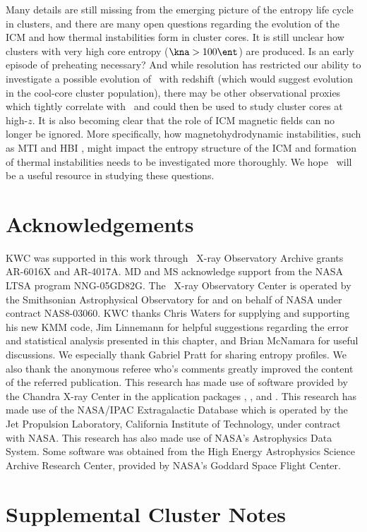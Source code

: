 Many details are still missing from the emerging picture of the
entropy life cycle in clusters, and there are many open questions
regarding the evolution of the ICM and how thermal instabilities form
in cluster cores. It is still unclear how clusters with very high core
entropy ($\kna > 100 \ent$) are produced. Is an early episode of
preheating necessary? And while resolution has restricted our ability
to investigate a possible evolution of \kna\ with redshift (which
would suggest evolution in the cool-core cluster population), there
may be other observational proxies which tightly correlate with
\kna\ and could then be used to study cluster cores at high-$z$. It is
also becoming clear that the role of ICM magnetic fields can no longer
be ignored. More specifically, how magnetohydrodynamic instabilities,
such as MTI \citep{2000ApJ...534..420B, 2008ApJ...673..758Q} and HBI
\citep{2008ApJ...677L...9P}, might impact the entropy structure of the
ICM and formation of thermal instabilities needs to be investigated
more thoroughly. We hope \accept\ will be a useful resource in
studying these questions.

\section{Acknowledgements}

KWC was supported in this work through \chandra\ X-ray Observatory
Archive grants AR-6016X and AR-4017A. MD and MS acknowledge support
from the NASA LTSA program NNG-05GD82G. The \chandra\ X-ray
Observatory Center is operated by the Smithsonian Astrophysical
Observatory for and on behalf of NASA under contract NAS8-03060. KWC
thanks Chris Waters for supplying and supporting his new KMM code, Jim
Linnemann for helpful suggestions regarding the error and statistical
analysis presented in this chapter, and Brian McNamara for useful
discussions. We especially thank Gabriel Pratt for sharing entropy
profiles. We also thank the anonymous referee who's comments greatly
improved the content of the referred publication. This research has
made use of software provided by the Chandra X-ray Center in the
application packages \ciao, \chips, and \sherpa. This research has
made use of the NASA/IPAC Extragalactic Database which is operated by
the Jet Propulsion Laboratory, California Institute of Technology,
under contract with NASA. This research has also made use of NASA's
Astrophysics Data System. Some software was obtained from the High
Energy Astrophysics Science Archive Research Center, provided by
NASA's Goddard Space Flight Center.

\section{Supplemental Cluster Notes}
\label{sec:entsuppsuppnotes}


